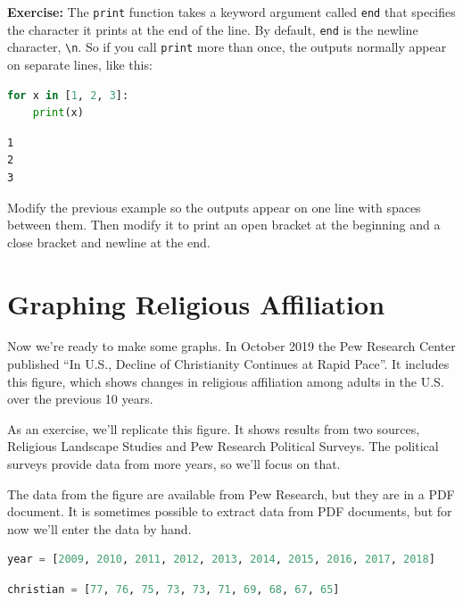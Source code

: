\textbf{Exercise:} The \passthrough{\lstinline!print!} function takes a
keyword argument called \passthrough{\lstinline!end!} that specifies the
character it prints at the end of the line. By default,
\passthrough{\lstinline!end!} is the newline character,
\passthrough{\lstinline!\\n!}. So if you call
\passthrough{\lstinline!print!} more than once, the outputs normally
appear on separate lines, like this:

\begin{lstlisting}[language=Python,style=source]
for x in [1, 2, 3]:
    print(x)
\end{lstlisting}

\begin{lstlisting}[style=output]
1
2
3
\end{lstlisting}

Modify the previous example so the outputs appear on one line with
spaces between them. Then modify it to print an open bracket at the
beginning and a close bracket and newline at the end.

\section{Graphing Religious
Affiliation}\label{graphing-religious-affiliation}

Now we're ready to make some graphs. In October 2019 the Pew Research
Center published ``In U.S., Decline of Christianity Continues at Rapid
Pace''. It includes this figure, which shows changes in religious
affiliation among adults in the U.S. over the previous 10 years.

As an exercise, we'll replicate this figure. It shows results from two
sources, Religious Landscape Studies and Pew Research Political Surveys.
The political surveys provide data from more years, so we'll focus on
that.

The data from the figure are available from Pew Research, but they are
in a PDF document. It is sometimes possible to extract data from PDF
documents, but for now we'll enter the data by hand.

\begin{lstlisting}[language=Python,style=source]
year = [2009, 2010, 2011, 2012, 2013, 2014, 2015, 2016, 2017, 2018]
\end{lstlisting}

\begin{lstlisting}[language=Python,style=source]
christian = [77, 76, 75, 73, 73, 71, 69, 68, 67, 65]
\end{lstlisting}

